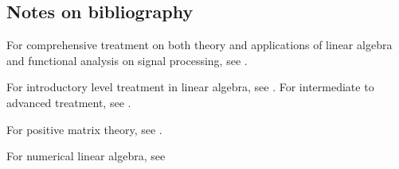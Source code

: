 \begin{refsection}
\section{Notes on bibliography}

For comprehensive treatment on both theory and applications of linear algebra and functional analysis on signal processing, see \cite{moon2000mathematical}.


For introductory level treatment in linear algebra, see \cite{meyer2000matrix}.
For intermediate to advanced treatment, see \cite{axler2015linear}\cite{banerjee2014linear}\cite{horn2012matrix}\cite{hom1991topics}.


For positive matrix theory, see \cite{luenberger1979introduction}\cite{horn2012matrix}.

For numerical linear algebra, see \cite{saad2003iterative}\cite{golub2013matrix}


\printbibliography

\stopcontents[chapters]
\end{refsection}